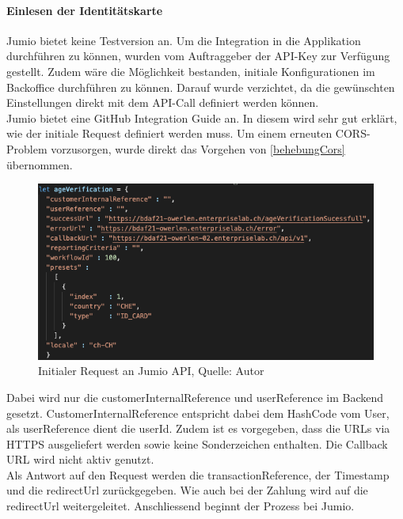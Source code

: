 \paragraph{Einlesen der Identitätskarte}
Jumio bietet keine Testversion an. Um die Integration in die Applikation durchführen zu können, wurden vom Auftraggeber der API-Key zur Verfügung gestellt. Zudem wäre die Möglichkeit bestanden, initiale Konfigurationen im Backoffice durchführen zu können. Darauf wurde verzichtet, da die gewünschten Einstellungen direkt mit dem API-Call definiert werden können. \\
Jumio bietet eine GitHub Integration Guide an. In diesem wird sehr gut erklärt, wie der initiale Request definiert werden muss. Um einem erneuten CORS-Problem vorzusorgen, wurde direkt das Vorgehen von \ref{behebungCors} übernommen. \\

 \begin{figure}[H]
	\centering
	\includegraphics[scale=0.5]{images/initRequestJumio.PNG}
	\caption[Initialer Request an Jumio API]{Initialer Request an Jumio API, Quelle: Autor}
	\label{img: jumioInitialRequest}
\end{figure} 

Dabei wird nur die \glqq customerInternalReference\grqq{} und \glqq userReference\grqq{} im Backend gesetzt. CustomerInternalReference entspricht dabei dem HashCode vom User, als userReference dient die userId. Zudem ist es vorgegeben, dass die \ac{URL}s via \ac{HTTPS} ausgeliefert werden sowie keine Sonderzeichen enthalten. Die Callback URL wird nicht aktiv genutzt. \\

Als Antwort auf den Request werden die transactionReference, der Timestamp und die redirectUrl zurückgegeben. Wie auch bei der Zahlung wird auf die redirectUrl weitergeleitet. Anschliessend beginnt der Prozess bei Jumio.

